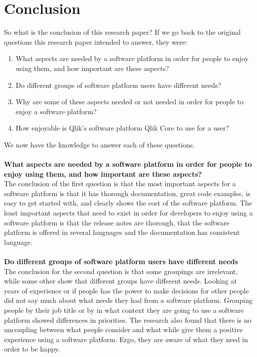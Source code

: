 \documentclass{cslthse-msc}
\begin{document}
    \chapter{Conclusion}
    So what is the conclusion of this research paper? If we go back to the original questions this research paper intended to answer, they were:
    \begin{enumerate}
        \item What aspects are needed by a software platform in order for people to enjoy using them, and how important are these aspects?
        \item Do different groups of software platform users have different needs?
        \item Why are some of these aspects needed or not needed in order for people to enjoy a software platform?
        \item How enjoyable is Qlik's software platform Qlik Core to use for a user?
    \end{enumerate}
    We now have the knowledge to answer each of these questions.\\\\
    \textbf{What aspects are needed by a software platform in order for people to enjoy using them, and how important are these aspects?}\\
    The conclusion of the first question is that the most important aspects for a software platform is that it has thorough documentation, great code examples, is easy to get started with, and clearly shows the cost of the software platform. The least important aspects that need to exist in order for developers to enjoy using a software platform is that the release notes are thorough, that the software platform is offered in several languages and the documentation has consistent language.\\\\
    \textbf{Do different groups of software platform users have different needs}\\
    The conclusion for the second question is that some groupings are irrelevant, while some other show that different groups have different needs. Looking at years of experience or if people has the power to make decisions for other people did not say much about what needs they had from a software platform. Grouping people by their job title or by in what context they are going to use a software platform showed differences in priorities. The research also found that there is no uncoupling between what people consider and what while give them a positive experience using a software platform. Ergo, they are aware of what they need in order to be happy. \\
\end{document}
